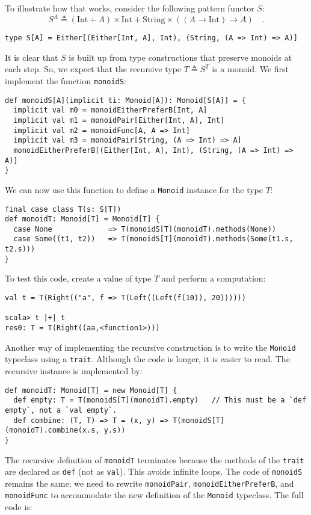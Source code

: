 To illustrate how that works, consider the following pattern functor
$S$:
\[
S^{A}\triangleq\left(\text{Int}+A\right)\times\text{Int}+\text{String}\times\left(\left(A\rightarrow\text{Int}\right)\rightarrow A\right)\quad.
\]
\begin{lstlisting}
type S[A] = Either[(Either[Int, A], Int), (String, (A => Int) => A)]
\end{lstlisting}

It is clear that $S$ is built up from type constructions that preserve
monoids at each step. So, we expect that the recursive type $T\triangleq S^{T}$
is a monoid. We first implement the function \lstinline!monoidS!:
\begin{lstlisting}
def monoidS[A](implicit ti: Monoid[A]): Monoid[S[A]] = {
  implicit val m0 = monoidEitherPreferB[Int, A]
  implicit val m1 = monoidPair[Either[Int, A], Int]
  implicit val m2 = monoidFunc[A, A => Int]
  implicit val m3 = monoidPair[String, (A => Int) => A]
  monoidEitherPreferB[(Either[Int, A], Int), (String, (A => Int) => A)]
}
\end{lstlisting}
We can now use this function to define a \lstinline!Monoid! instance
for the type $T$:
\begin{lstlisting}
final case class T(s: S[T])
def monoidT: Monoid[T] = Monoid[T] {
  case None             => T(monoidS[T](monoidT).methods(None))
  case Some((t1, t2))   => T(monoidS[T](monoidT).methods(Some(t1.s, t2.s)))
}
\end{lstlisting}
To test this code, create a value of type $T$ and perform a computation:
\begin{lstlisting}
val t = T(Right(("a", f => T(Left((Left(f(10)), 20))))))

scala> t |+| t
res0: T = T(Right((aa,<function1>)))
\end{lstlisting}

Another way of implementing the recursive construction is to write
the \lstinline!Monoid! typeclass using a \lstinline!trait!. Although
the code is longer, it is easier to read. The recursive instance is
implemented by:
\begin{lstlisting}
def monoidT: Monoid[T] = new Monoid[T] {
  def empty: T = T(monoidS[T](monoidT).empty)   // This must be a `def empty`, not a `val empty`.
  def combine: (T, T) => T = (x, y) => T(monoidS[T](monoidT).combine(x.s, y.s))
}
\end{lstlisting}
 The recursive definition of \lstinline!monoidT! terminates because
the methods of the \lstinline!trait! are declared as \lstinline!def!
(not as \lstinline!val!). This avoids infinite loops. The code of
\lstinline!monoidS! remains the same; we need to rewrite \lstinline!monoidPair!,
\lstinline!monoidEitherPreferB!, and \lstinline!monoidFunc! to accommodate
the new definition of the \lstinline!Monoid! typeclass. The full
code is:

